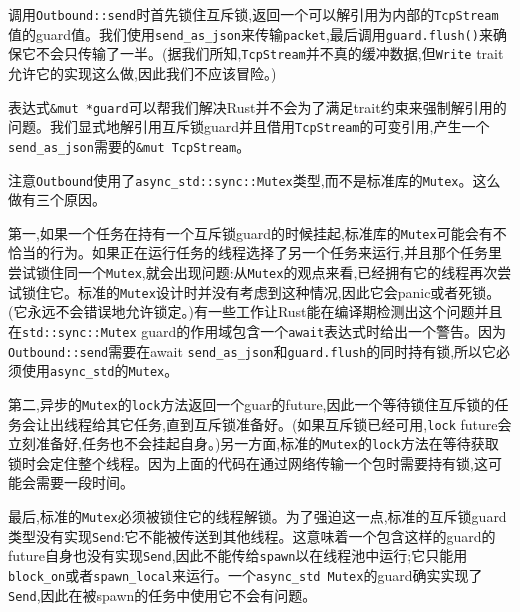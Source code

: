 调用\texttt{Outbound::send}时首先锁住互斥锁,返回一个可以解引用为内部的\texttt{TcpStream}值的guard值。我们使用\texttt{send\_as\_json}来传输\texttt{packet},最后调用\texttt{guard.flush()}来确保它不会只传输了一半。(据我们所知,\texttt{TcpStream}并不真的缓冲数据,但\texttt{Write} trait允许它的实现这么做,因此我们不应该冒险。)

表达式\texttt{\&mut *guard}可以帮我们解决Rust并不会为了满足trait约束来强制解引用的问题。我们显式地解引用互斥锁guard并且借用\texttt{TcpStream}的可变引用,产生一个\texttt{send\_as\_json}需要的\texttt{\&mut TcpStream}。

注意\texttt{Outbound}使用了\texttt{async\_std::sync::Mutex}类型,而不是标准库的\texttt{Mutex}。这么做有三个原因。

第一,如果一个任务在持有一个互斥锁guard的时候挂起,标准库的\texttt{Mutex}可能会有不恰当的行为。如果正在运行任务的线程选择了另一个任务来运行,并且那个任务里尝试锁住同一个\texttt{Mutex},就会出现问题:从\texttt{Mutex}的观点来看,已经拥有它的线程再次尝试锁住它。标准的\texttt{Mutex}设计时并没有考虑到这种情况,因此它会panic或者死锁。(它永远不会错误地允许锁定。)有一些工作让Rust能在编译期检测出这个问题并且在\texttt{std::sync::Mutex} guard的作用域包含一个\texttt{await}表达式时给出一个警告。因为\texttt{Outbound::send}需要在await \texttt{send\_as\_json}和\texttt{guard.flush}的同时持有锁,所以它必须使用\texttt{async\_std}的\texttt{Mutex}。

第二,异步的\texttt{Mutex}的\texttt{lock}方法返回一个guar的future,因此一个等待锁住互斥锁的任务会让出线程给其它任务,直到互斥锁准备好。(如果互斥锁已经可用,\texttt{lock} future会立刻准备好,任务也不会挂起自身。)另一方面,标准的\texttt{Mutex}的\texttt{lock}方法在等待获取锁时会定住整个线程。因为上面的代码在通过网络传输一个包时需要持有锁,这可能会需要一段时间。

最后,标准的\texttt{Mutex}必须被锁住它的线程解锁。为了强迫这一点,标准的互斥锁guard类型没有实现\texttt{Send}:它不能被传送到其他线程。这意味着一个包含这样的guard的future自身也没有实现\texttt{Send},因此不能传给\texttt{spawn}以在线程池中运行;它只能用\texttt{block\_on}或者\texttt{spawn\_local}来运行。一个\texttt{async\_std Mutex}的guard确实实现了\texttt{Send},因此在被spawn的任务中使用它不会有问题。

